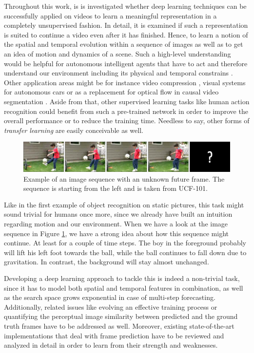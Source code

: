Throughout this work, is is investigated whether deep learning techniques can be successfully applied on videos to learn a meaningful representation in a completely unsupervised fashion. In detail, it is examined if such a representation is suited to continue a video even after it has finished. Hence, to learn a notion of the spatial and temporal evolution within a sequence of images as well as to get an idea of motion and dynamics of a scene. Such a high-level understanding would be helpful for autonomous intelligent agents that have to act and therefore understand our environment including its physical and temporal constrains \parencite{unsup_learn_lstm}. Other application areas might be for instance video compression \parencite{frame_interpol}, visual systems for autonomous cars or as a replacement for optical flow in causal video segmentation \parencite{causal_video_seg}. Aside from that, other supervised learning tasks like human action recognition could benefit from such a pre-trained network in order to improve the overall performance or to reduce the training time. Needless to say, other forms of \textit{transfer learning} are easily conceivable as well.

\begin{figure}[htpb]
	\centering
	\includegraphics[width=1.0\linewidth]{figures/ucf-intro/serie1.png} 
	\caption[Image Sequence Example]{Example of an image sequence with an unknown future frame. The sequence is starting from the left and is taken from UCF-101.} \label{fig:intro-seq}
\end{figure}

Like in the first example of object recognition on static pictures, this task might sound trivial for humans once more, since we already have built an intuition regarding motion and our environment. When we have a look at the image sequence in Figure \ref{fig:intro-seq}, we have a strong idea about how this sequence might continue. At least for a couple of time steps. The boy in the foreground probably will lift his left foot towards the ball, while the ball continues to fall down due to gravitation. In contrast, the background will stay almost unchanged.

Developing a deep learning approach to tackle this is indeed a non-trivial task, since it has to model both spatial and temporal features in combination, as well as the search space grows exponential in case of multi-step forecasting. Additionally, related issues like evolving an effective training process or quantifying the perceptual image similarity between predicted and the ground truth frames have to be addressed as well. Moreover, existing state-of-the-art implementations that deal with frame prediction have to be reviewed and analyzed in detail in order to learn from their strength and weaknesses.



